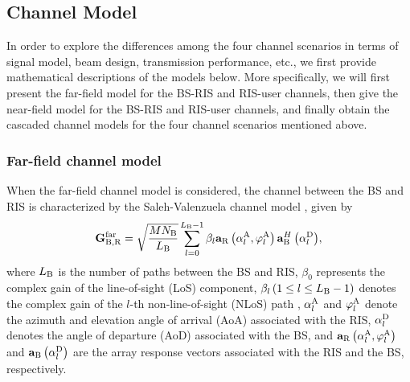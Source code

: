 \documentclass[lettersize, journal]{IEEEtran}
\begin{document}
\subsection{Channel Model}

In order to explore the differences among the four channel scenarios in terms of signal model, beam design, transmission performance, etc., we first provide mathematical descriptions of the models below.
More specifically, we will first present the far-field model for the BS-RIS and RIS-user channels, then give the near-field model for the BS-RIS and RIS-user channels, and finally obtain the cascaded channel models for the four channel scenarios mentioned above.

\subsubsection{Far-field channel model}

When the far-field channel model is considered, the channel between the BS and RIS is characterized by the Saleh-Valenzuela channel model \cite{TWC2014_SpatiallySparse}, given by 
\begin{equation}\label{ChannelGain_BR}
{{\bf{G}}_{{\rm{B}}, {\rm{R}}}^{\rm{far}}} = \sqrt {\frac{{{M}{N_{\rm{B}}}}}{L_{\rm{B}}}}   \sum\limits_{l = 0}^{L_{\rm{B}}-1} {{\beta _l}{\bf{a}}_{\rm{R}}\left( {\alpha _l^{\rm{A}}}, {\varphi _l^{\rm{A}}} \right) {{\bf{a}}_{\rm{B}}^H}\left( {\alpha _l^{\rm{D}}} \right) },
\end{equation}
where $L_{\rm{B}}$ is the number of paths between the BS and RIS, ${\beta _0}$ represents the complex gain of the line-of-sight (LoS) component, ${\beta _l} \left( 1\le l \le L_{\rm{B}} -1 \right)$ denotes the complex gain of the $l$-th non-line-of-sight (NLoS) path \cite{JSAC2014_mmWaveChannel},
${\alpha _l^{\rm{A}}}$ and $\varphi _l^{\rm{A}}$ denote the azimuth and elevation angle of arrival (AoA) associated with the RIS, ${\alpha _l^{\rm{D}}}$ denotes the angle of departure (AoD) associated with the BS, and ${\bf{a}}_{\rm{R}}\left( {\alpha _l^{\rm{A}}}, {\varphi _l^{\rm{A}}} \right)$ and ${{\bf{a}}_{\rm{B}}}\left( {\alpha _l^{\rm{D}}} \right)$ are the array response vectors associated with the RIS and the BS, respectively. 
\end{document}
